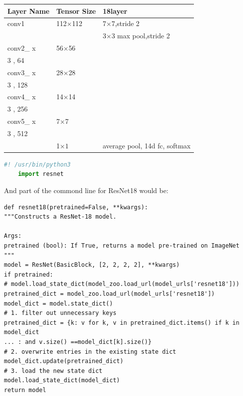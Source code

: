 \documentclass{article}
\begin{document}
\begin{center} 
	\begin{tabular}{ | l | l | l |} 
		\hline 
		Layer Name & Tensor Size      & 18\-layer  \\ \hline 
		conv1  & 112$\times$112 & 7$\times$7,stride 2  \\ \hline 
		&                         & 3$\times$3 max pool,stride 2  \\ \hline 
		conv2\_ x    &  56$\times$56  & \( \left [  \begin{array}{lcl}  3 \times 3, 64 \\   3 \times 3, 64    \end{array}   \right] \times 2 \)\\ \hline
		conv3\_ x    &  28$\times$28  & \( \left [  \begin{array}{lcl}  3 \times 3, 128\\   3 \times 3, 128   \end{array}   \right] \times 2 \)\\ \hline
		conv4\_ x    &  14$\times$14  & \( \left [  \begin{array}{lcl}  3 \times 3, 256\\   3 \times 3, 256   \end{array}   \right] \times 2 \)\\ \hline
		conv5\_ x    &  7$\times$7     & \( \left [  \begin{array}{lcl}  3 \times 3, 512\\   3 \times 3, 512 \end{array}   \right] \times 2 \)\\ \hline
		& 1$\times 1$     & average pool, 14\-d fc, softmax \\ \hline
	\end{tabular}  
\end{center} 

\begin{file}
	\begin{lstlisting}[language=Python]
	#! /usr/bin/python3
	import resnet
	\end{lstlisting}
\end{file}

And part of the commond line for ResNet18 would be:
\begin{commandline}
	\begin{verbatim}
def resnet18(pretrained=False, **kwargs):
"""Constructs a ResNet-18 model.

Args:
pretrained (bool): If True, returns a model pre-trained on ImageNet
"""
model = ResNet(BasicBlock, [2, 2, 2, 2], **kwargs)
if pretrained:
# model.load_state_dict(model_zoo.load_url(model_urls['resnet18']))
pretrained_dict = model_zoo.load_url(model_urls['resnet18'])
model_dict = model.state_dict()
# 1. filter out unnecessary keys
pretrained_dict = {k: v for k, v in pretrained_dict.items() if k in model_dict 
... : and v.size() ==model_dict[k].size()}
# 2. overwrite entries in the existing state dict
model_dict.update(pretrained_dict) 
# 3. load the new state dict
model.load_state_dict(model_dict)
return model
	\end{verbatim}
\end{commandline}
\end{document}
